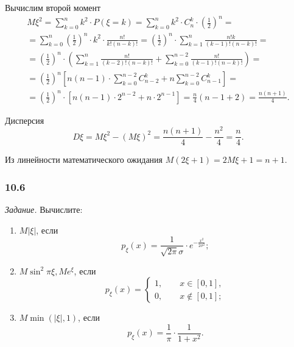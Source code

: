 Вычислим второй момент
\begin{equation*}
\begin{split}
  M \xi^2 =
  \sum \limits_{k=0}^n k^2 \cdot P \left( \xi = k \right) =
  \sum \limits_{k=0}^n k^2 \cdot C_n^k \cdot \left( \frac{1}{2} \right)^n = \\
  = \sum \limits_{k=0}^n
    \left( \frac{1}{2} \right)^n \cdot k^2 \cdot
    \frac{n!}{k! \left( n-k \right)!} =
  \left( \frac{1}{2} \right)^n \cdot \sum \limits_{k=1}^n
    \frac{n!k}{ \left( k-1 \right)! \left( n-k \right)!} = \\
  = \left( \frac{1}{2} \right)^n \cdot \left(
    \sum \limits_{k=1}^n
      \frac{n!}{ \left( k-2 \right)! \left( n-k \right)!} +
    \sum \limits_{k=0}^{n-2} \frac{n!}{ \left( k-1 \right)! \left( n-k \right)!}
  \right) = \\
  = \left( \frac{1}{2} \right)^n \left[
    n \left( n-1 \right) \cdot \sum \limits_{k=0}^{n-2} C_{n-2}^k +
    n \sum \limits_{k=0}^{n-2} C_{n-1}^k
  \right] = \\
  = \left( \frac{1}{2} \right)^n \cdot
  \left[ n \left( n-1 \right) \cdot 2^{n-2} + n \cdot 2^{n-1} \right] =
  \frac{n}{4} \left( n-1+2 \right) =
  \frac{n \left( n+1 \right) }{4}.
\end{split}
\end{equation*}

Дисперсия
$$D \xi =
M \xi^2 - \left( M \xi \right)^2 =
\frac{n \left( n+1 \right) }{4} - \frac{n^2}{4} =
\frac{n}{4}.$$

Из линейности математического ожидания $M \left( 2 \xi + 1 \right) = 2M \xi + 1 = n + 1$.

\subsubsection*{10.6}

\textit{Задание.} Вычислите:
\begin{enumerate}[label=\alph*)]
\item $M \left| \xi \right| $, если
$$p_{ \xi } \left( x \right) =
\frac{1}{ \sqrt{2 \pi } \sigma } \cdot e^{- \frac{x^2}{2 \sigma^2}};$$
\item $M \sin^2 \pi \xi, Me^{ \xi }$, если
$$p_{ \xi } \left( x \right) =
\begin{cases}
1, \qquad x \in \left[ 0, 1 \right], \\
0, \qquad x \notin \left[ 0, 1 \right];
\end{cases}$$
\item $M \min \left( \left| \xi \right|, 1 \right) $, если
$$p_{ \xi } \left( x \right) =
\frac{1}{ \pi } \cdot \frac{1}{1+x^2}.$$
\end{enumerate}

